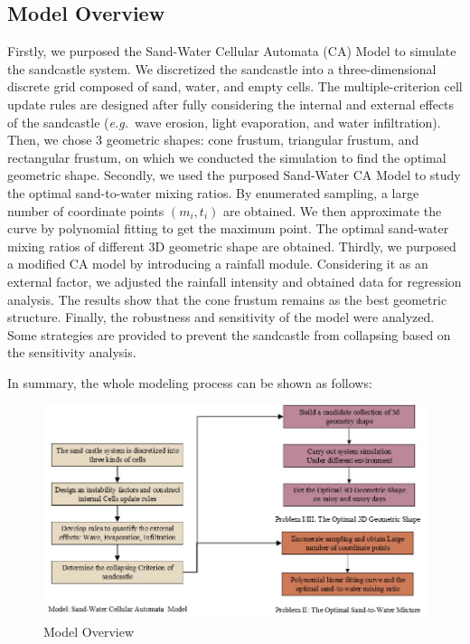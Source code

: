 \documentclass{mcmthesis}		    %
\def\eg{\mbox{\textit{e.g.}}}
\begin{document}
	\subsection{Model Overview}
    Firstly, we purposed the Sand-Water Cellular Automata (CA) Model to simulate the sandcastle system. We discretized the sandcastle into a three-dimensional discrete grid composed of sand, water, and empty cells. The multiple-criterion cell update rules are designed after fully considering the internal and external effects of the sandcastle (\eg~wave erosion, light evaporation, and water infiltration). Then, we chose 3 geometric shapes: cone frustum, triangular frustum, and rectangular frustum, on which we conducted the simulation to find the optimal geometric shape.
    Secondly, we used the purposed Sand-Water CA Model to study the optimal sand-to-water mixing ratios. By enumerated sampling, a large number of coordinate points $(m_i,t_i)$ are obtained. We then approximate the curve by polynomial fitting to get the maximum point. The optimal sand-water mixing ratios of different 3D geometric shape are obtained.
    Thirdly, we purposed a modified CA model by introducing a rainfall module. Considering it as an external factor, we adjusted the rainfall intensity and obtained data for regression analysis. The results show that the cone frustum remains as the best geometric structure.
    Finally, the robustness and sensitivity of the model were analyzed. Some strategies are provided to prevent the sandcastle from collapsing based on the sensitivity analysis.
    
    In summary, the whole modeling process can be shown as follows:
    
    \begin{figure}[htbp]
		\centering
		\includegraphics[width=5in]{overview.jpg}
		\caption{Model Overview}
	\end{figure}
\end{document}
